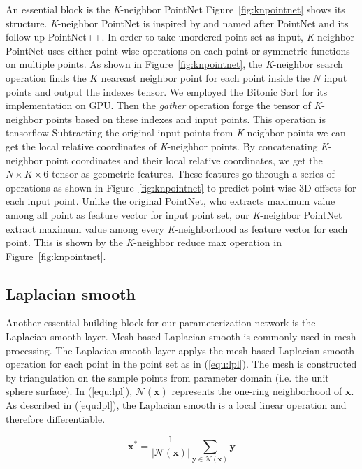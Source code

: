 An essential block is the \textit{K}-neighbor PointNet 
%
Figure~\ref{fig:knpointnet} shows its structure. 
\textit{K}-neighbor PointNet is inspired by and named after PointNet\cite{PointNet} and its follow-up PointNet++\cite{NIPS2017_7095}. 
%
In order to take unordered point set as input, \textit{K}-neighbor PointNet uses either point-wise operations on each point or symmetric functions on multiple points. As shown in Figure~\ref{fig:knpointnet}, the \textit{K}-neighbor search operation finds the $K$ neareast neighbor point for each point inside the $N$ input points and output the indexes tensor. We employed the Bitonic Sort\cite{bitonicsorter} for its implementation on GPU. Then the  \emph{gather} operation forge the tensor of \textit{K}-neighbor points based on these indexes and input points. This operation is tensorflow  Subtracting the original input points from \textit{K}-neighbor points we can get the local relative coordinates of \textit{K}-neighbor points. By concatenating \textit{K}-neighbor point coordinates and their local relative coordinates, we get the $N\times K\times6$ tensor as geometric features. These features go through a series of operations as shown in Figure~\ref{fig:knpointnet} to predict point-wise 3D offsets for each input point. Unlike the original PointNet\cite{PointNet}, who extracts maximum value among all point as feature vector for input point set, our \textit{K}-neighbor PointNet extract maximum value among every \textit{K}-neighborhood as feature vector for each point. This is shown by the \textit{K}-neighbor reduce max operation in Figure~\ref{fig:knpointnet}.

\subsection{Laplacian smooth}
Another essential building block for our parameterization network is the Laplacian smooth layer. Mesh based Laplacian smooth is commonly used in mesh processing. The Laplacian smooth layer applys the mesh based Laplacian smooth operation for each point in the point set as in (\ref{equ:lpl}). The mesh is constructed by triangulation on the sample points from parameter domain (i.e. the unit sphere surface). In (\ref{equ:lpl}), $\mathcal{N}(\mathbf{x})$ represents the one-ring neighborhood of $\mathbf{x}$. As described in (\ref{equ:lpl}), the Laplacian smooth is a local linear operation and therefore differentiable.

\begin{equation}
\mathbf{x^*} = \frac{1}{|\mathcal{N}(\mathbf{x})|}\sum_{\mathbf{y}\in\mathcal{N}(\mathbf{x})}\mathbf{y}
\label{equ:lpl}
\end{equation}


